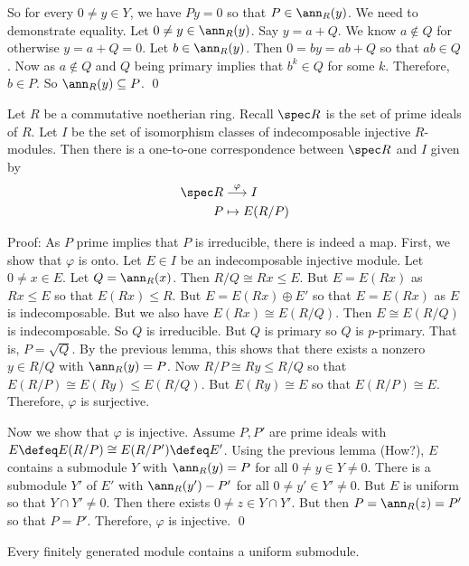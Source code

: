 So for every $0 \neq y \in Y$, we have $Py=0$ so that $P \in \ann_R(y)$. We need to demonstrate equality. Let $0\neq y \in \ann_R(y)$. Say $y=a+Q$. We know $a \notin Q$ for otherwise $y=a+Q=0$. Let $b \in \ann_R(y)$. Then $0=by=ab+Q$ so that $ab \in Q$. Now as $a \notin Q$ and $Q$ being primary implies that $b^k \in Q$ for some $k$. Therefore, $b \in P$. So $\ann_R(y) \subseteq P$. \qed \\

\begin{thm}
Let $R$ be a commutative noetherian ring. Recall $\spec R$ is the set of prime ideals of $R$. Let $I$ be the set of isomorphism classes of indecomposable injective $R$-modules. Then there is a one-to-one correspondence between $\spec R$ and $I$ given by
\[
\begin{split}
\spec R &\stackrel{\varphi}{\longrightarrow} I \\
P &\mapsto E(R/P)
\end{split}
\]
\end{thm}

Proof: As $P$ prime implies that $P$ is irreducible, there is indeed a map. First, we show that $\varphi$ is onto. Let $E \in I$ be an indecomposable injective module. Let $0\neq x \in E$. Let $Q=\ann_R(x)$. Then $R/Q \cong Rx \leq E$. But $E=E(Rx)$ as $Rx \leq E$ so that $E(Rx) \leq R$. But $E=E(Rx) \oplus E'$ so that $E=E(Rx)$ as $E$ is indecomposable. But we also have $E(Rx) \cong E(R/Q)$. Then $E \cong E(R/Q)$ is indecomposable. So $Q$ is irreducible. But $Q$ is primary so $Q$ is $p$-primary. That is, $P=\sqrt{Q}$. By the previous lemma, this shows that there exists a nonzero $y \in R/Q$ with $\ann_R(y)=P$. Now $R/P \cong Ry \leq R/Q$ so that $E(R/P) \cong E(Ry) \leq E(R/Q)$. But $E(Ry) \cong E$ so that $E(R/P) \cong E$. Therefore, $\varphi$ is surjective. 

Now we show that $\varphi$ is injective. Assume $P,P'$ are prime ideals with $E\defeq E(R/P) \cong E(R/P') \defeq E'$. Using the previous lemma (How?), $E$ contains a submodule $Y$ with $\ann_R(y)=P$ for all $0 \neq y \in Y \neq 0$. There is a submodule $Y'$ of $E'$ with $\ann_R(y')-P'$ for all $0 \neq y' \in Y' \neq 0$. But $E$ is uniform so that $Y \cap Y' \neq 0$. Then there exists $0 \neq z\in Y \cap Y'$. But then $P=\ann_R(z)=P'$ so that $P=P'$. Therefore, $\varphi$ is injective. \qed \\

\begin{lem}
Every finitely generated module contains a uniform submodule.
\end{lem}

